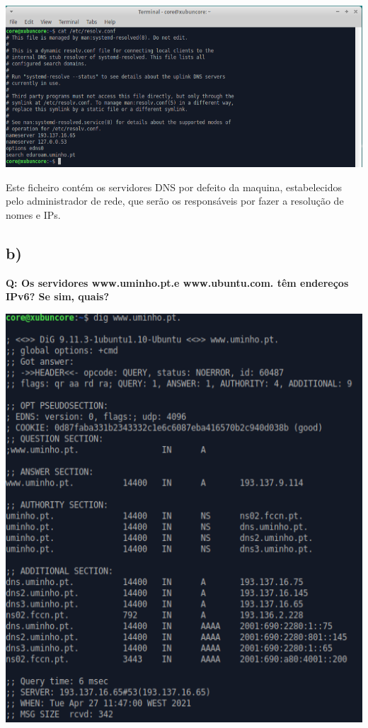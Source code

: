 \documentclass[a4paper]{article}
\begin{document}
\begin{center}
	\includegraphics[scale=0.5]{images/1a}
\end{center}


Este ficheiro contém os servidores DNS por defeito da maquina, estabelecidos pelo administrador de rede, que serão os responsáveis por fazer a resolução de nomes e IPs.

\subsection{ b)} \textbf{Q: Os servidores www.uminho.pt.e  www.ubuntu.com. têm endereços IPv6?  Se sim, quais?} \par

\begin{center}
	\includegraphics[scale=0.5]{images/1bUminho}
\end{center}
\end{document}
